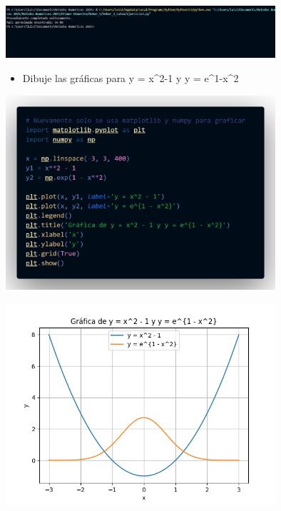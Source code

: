 \documentclass[12pt]{article}
\begin{document}
\vspace{0.5cm}

\begin{minipage}{0.75\textwidth}
    \raggedleft
    \includegraphics[width=0.75\textwidth]{inFiles/Figures/ejec4.jpg}
\end{minipage}

\vspace{0.5cm}


\begin{itemize}
    \item {Dibuje las gráficas para y = x^2-1 y y = e^1-x^2}
\end{itemize}

\begin{minipage}{0.75\textwidth}
    \raggedleft
    \includegraphics[width=0.75\textwidth]{inFiles/Figures/cd6.png}
\end{minipage}

\vspace{0.5cm}

\begin{minipage}{0.75\textwidth}
    \raggedleft
    \includegraphics[width=0.75\textwidth]{inFiles/Figures/Graf_3.png}
\end{minipage}
\end{document}
